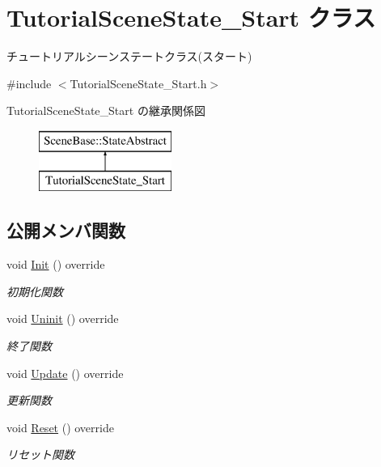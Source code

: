 \hypertarget{class_tutorial_scene_state___start}{}\section{Tutorial\+Scene\+State\+\_\+\+Start クラス}
\label{class_tutorial_scene_state___start}


チュートリアルシーンステートクラス(スタート)  




{\ttfamily \#include $<$Tutorial\+Scene\+State\+\_\+\+Start.\+h$>$}

Tutorial\+Scene\+State\+\_\+\+Start の継承関係図\begin{figure}[H]
\begin{center}
\leavevmode
\includegraphics[height=2.000000cm]{class_tutorial_scene_state___start}
\end{center}
\end{figure}
\subsection*{公開メンバ関数}
\begin{DoxyCompactItemize}
\item 
void \mbox{\hyperlink{class_tutorial_scene_state___start_acd4cd7e4efeebffa9616d7ca31c7b1c0}{Init}} () override
\begin{DoxyCompactList}\small\item\em 初期化関数 \end{DoxyCompactList}\item 
void \mbox{\hyperlink{class_tutorial_scene_state___start_a974962addfb0bcba90fbab64ac6d50f0}{Uninit}} () override
\begin{DoxyCompactList}\small\item\em 終了関数 \end{DoxyCompactList}\item 
void \mbox{\hyperlink{class_tutorial_scene_state___start_a93c322692bf56172f383d3e5b17cd85c}{Update}} () override
\begin{DoxyCompactList}\small\item\em 更新関数 \end{DoxyCompactList}\item 
void \mbox{\hyperlink{class_tutorial_scene_state___start_a40bfdf7acd93b619138bf708adff31e4}{Reset}} () override
\begin{DoxyCompactList}\small\item\em リセット関数 \end{DoxyCompactList}\end{DoxyCompactItemize}
